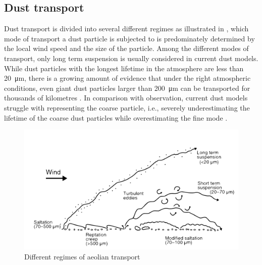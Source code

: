 \subsection{Dust transport}
Dust transport is divided into several different regimes as illustrated in , which mode of transport a dust particle is subjected to is predominately determined by the local wind speed and the size of the particle. Among the different modes of transport, only long term suspension is usually considered in current dust models.
While dust particles with the longest lifetime in the atmosphere are less than \SI{20}{\micro\metre}, there is a growing amount of evidence that under the right atmospheric conditions, even giant dust particles larger than \SI{200}{\micro\metre} can be transported for thousands of kilometres \parencite{van2018mysterious}. 
In comparison with observation, current dust models struggle with representing the coarse particle, i.e., severely underestimating the lifetime of the coarse dust particles while overestimating the fine mode \parencite{adebiyi2020dust}. 
\begin{figure}[htbp]
  \centering
  \includegraphics[draft=false,width = \textwidth]{texfiles/figs/aeolian_transport_Parsons_Abrahams.pdf}
  \caption{Different regimes of aeolian transport \parencite{nickling2009aeolian}}
  \label{fig:modes_of_dust_transport}
\end{figure}

